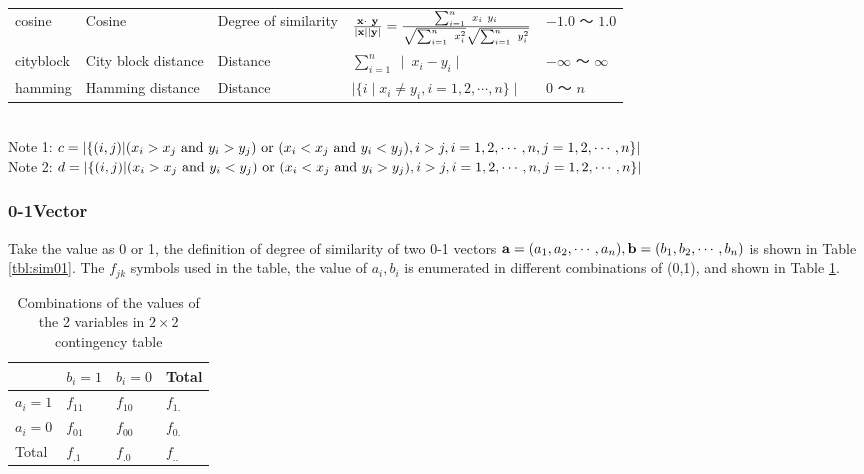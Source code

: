 \begin{table}[htbp]
\begin{center}
{\begin{tabular}{lllll}
cosine   & Cosine   & Degree of similarity & 
$
\frac{\bf{x}\cdot~\bf{y}}{\mid\bf{x}\mid\mid\bf{y}\mid}=\frac{\sum_{i=1}^n~x_i~y_i}{\sqrt{\sum_{i=1}^n~x_i^2}\sqrt{\sum_{i=1}^n~y_i^2}}
$
 & $-1.0$ 〜 $1.0$ \\

cityblock   & City block distance   & Distance & 
$
\sum_{i=1}^n~\mid~x_i-y_i\mid
$
 & $-\infty$ 〜 $\infty$\\

hamming   & Hamming distance   & Distance & 
$
\mid\{i \mid x_i\ne y_i, i=1,2,\cdots,n\}\mid
$
 & $0$ 〜 $n$\\

\hline
\end{tabular}
}
{\footnotesize
\\
Note 1:
$c=|\{(i,j)|(x_i>x_j ~{\rm and}~ y_i>y_j) ~{\rm or}~ (x_i<x_j ~{\rm and}~ y_i<y_j), i>j, i=1,2,\cdots,n, j=1,2,\cdots,n\}|$\\
Note 2:
$d=|\{(i,j)|(x_i>x_j ~{\rm and}~ y_i<y_j) ~{\rm or}~ (x_i<x_j ~{\rm and}~ y_i>y_j), i>j, i=1,2,\cdots,n, j=1,2,\cdots,n\}|$
}

\end{center}
\end{table}

\subsubsection*{0-1Vector}
Take the value as 0 or 1, the definition of degree of similarity of two 0-1 vectors ${\bf a}=(a_1,a_2,\cdots,a_n),{\bf b}=(b_1,b_2,\cdots,b_n)$ is shown in Table \ref{tbl:sim01}.
The $f_{jk}$ symbols used in the table, the value of $a_i,b_i$ is enumerated in different combinations of (0,1), and shown in Table \ref{tbl:matrix}.

\begin{table}[htbp]
\begin{center}
\caption{Combinations of the values of the 2 variables in $2\times 2$ contingency table\label{tbl:matrix}}
{\small 
\begin{tabular}{l|ll|l}
\hline
 & $b_i=1$ & $b_i=0$ & Total\\
\hline
$a_i=1$ & $f_{11}$ & $f_{10}$ & $f_{1.}$\\
$a_i=0$ & $f_{01}$ & $f_{00}$ & $f_{0.}$\\
\hline
Total & $f_{.1}$ & $f_{.0}$ & $f_{..}$\\
\hline
\end{tabular}
}
\end{center}
\end{table}

